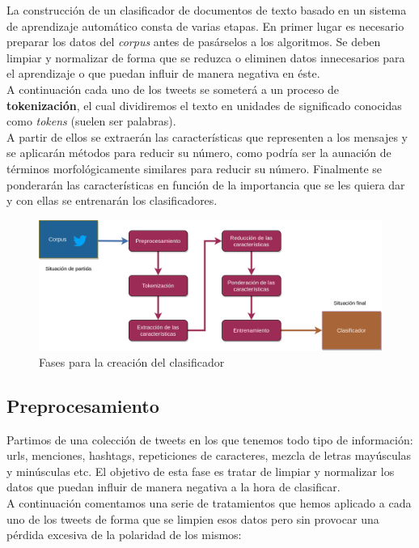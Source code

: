 \documentclass[a4paper,12pt]{report}
\begin{document}
{\setlength{\parindent}{0cm}
La construcción de un clasificador de documentos de texto basado en un sistema de aprendizaje automático consta de varias etapas. En primer lugar es necesario preparar los datos del \textit{corpus} antes de pasárselos a los algoritmos. Se deben limpiar y normalizar de forma que se reduzca o eliminen datos innecesarios para el aprendizaje o que puedan influir de manera negativa en éste.}
\vspace{2mm}\\
A continuación cada uno de los tweets se someterá a un proceso de \textbf{tokenización}, el cual dividiremos el texto en unidades de significado conocidas como \textit{tokens} (suelen ser palabras).\vspace{2mm}\\
A partir de ellos se extraerán las características que representen a los mensajes y se aplicarán métodos para reducir su número, como podría ser la aunación de términos morfológicamente similares para reducir su número. Finalmente se ponderarán las características en función de la importancia que se les quiera dar y con ellas se entrenarán los clasificadores. 

\vspace{4mm}
\begin{figure}[htbp!]
\centering
\includegraphics[scale=0.65]{images/Fases_SA.png}
\caption{Fases para la creación del clasificador}
\end{figure}
\vspace{2mm}


\subsection{Preprocesamiento}

{\setlength{\parindent}{0cm}
Partimos de una colección de tweets en los que tenemos todo tipo de información: urls, menciones, hashtags, repeticiones de caracteres, mezcla de letras mayúsculas y minúsculas etc. El objetivo de esta fase es tratar de limpiar y normalizar los datos que puedan influir de manera negativa a la hora de clasificar. \cite{Jain} }
\vspace{2mm}\\
A continuación comentamos una serie de tratamientos que hemos aplicado a cada uno de los tweets de forma que se limpien esos datos pero sin provocar una pérdida excesiva de la polaridad de los mismos:
\end{document}
